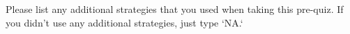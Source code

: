 \documentclass{ximera}
\begin{document}
\begin{question}
Please list any additional strategies that you used when taking this pre-quiz. If you didn't use any additional strategies, just type `NA.`
   \begin{freeResponse}
   \end{freeResponse}
\end{question}

%
\end{document}
